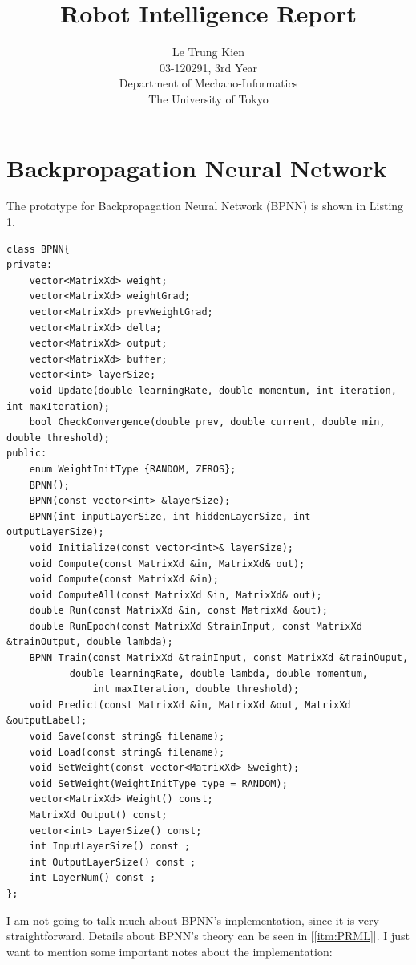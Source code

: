 \documentclass[a4paper, 11pt]{article}
\begin{document}
\title{Robot Intelligence Report}
\author{Le Trung Kien\\ 
  03-120291, 3rd Year \\
  Department of Mechano-Informatics \\ 
  The University of Tokyo
}
\maketitle
\section{Backpropagation Neural Network}
The prototype for Backpropagation Neural Network (BPNN) is shown in Listing 1.
\begin{lstlisting}[caption={Backpropagation Neural Network Class (bpnn.hpp)}]
class BPNN{
private:
    vector<MatrixXd> weight;
    vector<MatrixXd> weightGrad;
    vector<MatrixXd> prevWeightGrad;
    vector<MatrixXd> delta;
    vector<MatrixXd> output;
    vector<MatrixXd> buffer;
    vector<int> layerSize;
    void Update(double learningRate, double momentum, int iteration, int maxIteration);
    bool CheckConvergence(double prev, double current, double min, double threshold);
public:
    enum WeightInitType {RANDOM, ZEROS};
    BPNN();
    BPNN(const vector<int> &layerSize);
    BPNN(int inputLayerSize, int hiddenLayerSize, int outputLayerSize);
    void Initialize(const vector<int>& layerSize);
    void Compute(const MatrixXd &in, MatrixXd& out);
    void Compute(const MatrixXd &in);
    void ComputeAll(const MatrixXd &in, MatrixXd& out);
    double Run(const MatrixXd &in, const MatrixXd &out);
    double RunEpoch(const MatrixXd &trainInput, const MatrixXd &trainOutput, double lambda);
    BPNN Train(const MatrixXd &trainInput, const MatrixXd &trainOuput, 
	       double learningRate, double lambda, double momentum, 
               int maxIteration, double threshold);
    void Predict(const MatrixXd &in, MatrixXd &out, MatrixXd &outputLabel);
    void Save(const string& filename);
    void Load(const string& filename);
    void SetWeight(const vector<MatrixXd> &weight);
    void SetWeight(WeightInitType type = RANDOM);
    vector<MatrixXd> Weight() const;
    MatrixXd Output() const;
    vector<int> LayerSize() const;
    int InputLayerSize() const ;
    int OutputLayerSize() const ;
    int LayerNum() const ;
};
\end{lstlisting}
I am not going to talk much about BPNN's implementation, since it is very straightforward. Details about BPNN's theory can be seen in [\ref{itm:PRML}]. I just want to mention some important notes about the implementation:
\end{document}
